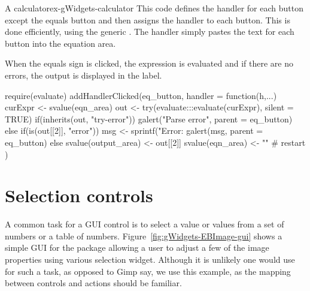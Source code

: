 \begin{example}{A calculator}{ex-gWidgets-calculator}
This code defines the handler for each button except the equals button
and then assigns the handler to each button. This is done efficiently,
using the generic . The handler simply pastes
the text for each button into the equation area.

\begin{Schunk}
\end{Schunk}

When the equals sign is clicked, the expression is evaluated and if
there are no errors, the output is displayed in the
label.
\begin{Schunk}
\begin{Sinput}
 require(evaluate)
 addHandlerClicked(eq_button, handler = function(h,...) {
   curExpr <- svalue(eqn_area)
   out <- try(evaluate:::evaluate(curExpr), silent = TRUE)
   if(inherits(out, "try-error")) {
     galert("Parse error", parent = eq_button)
   } else if(is(out[[2]], "error")) {
     msg <- sprintf("Error: %
     galert(msg, parent = eq_button)
   } else {
     svalue(output_area) <- out[[2]]
     svalue(eqn_area) <- ""            # restart
   }
 })
                   
\end{Sinput}
\end{Schunk}

\end{example}

\section{Selection controls}
\label{sec:gWidgets-widg-select-data}

A common task for a GUI control is to select a value or values from a
set of numbers or a table of
numbers. Figure~\ref{fig:gWidgets-EBImage-gui} shows a simple GUI for
the  package allowing a user to adjust a few of the image
properties using various selection widget. Although it is unlikely one
would use \R{} for such a task, as opposed to Gimp say, we use this
example, as the mapping between controls and actions should be
familiar.

